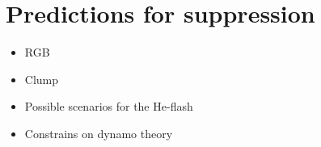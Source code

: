 \section{Predictions for suppression}
\begin{itemize}
\item RGB 
\item Clump
\item Possible scenarios for the He-flash
\item Constrains on dynamo theory
\end{itemize}